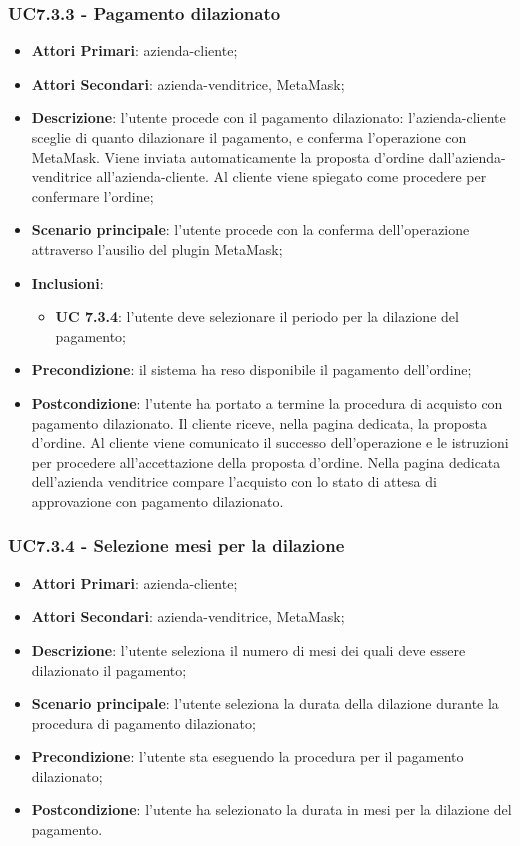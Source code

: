 \subsubsection{UC7.3.3 - Pagamento dilazionato}
\begin{itemize}
	\item \textbf{Attori Primari}: azienda-cliente;
	\item \textbf{Attori Secondari}: azienda-venditrice, MetaMask\glo;
	\item \textbf{Descrizione}: l'utente procede con il pagamento dilazionato: l'azienda-cliente sceglie di quanto dilazionare il pagamento, e conferma l'operazione con MetaMask\glo. Viene inviata automaticamente la proposta d'ordine dall'azienda-venditrice all'azienda-cliente. Al cliente viene spiegato come procedere per confermare l'ordine;
	\item \textbf{Scenario principale}: l'utente procede con la conferma dell'operazione attraverso l'ausilio del plugin MetaMask\glo;
	\item \textbf{Inclusioni}: 
	\begin{itemize}
		\item \textbf{UC 7.3.4}: l'utente deve selezionare il periodo per la dilazione del pagamento;
	\end{itemize}
	\item \textbf{Precondizione}: il sistema ha reso disponibile il pagamento dell'ordine;
	\item \textbf{Postcondizione}: l'utente ha portato a termine la procedura di acquisto con pagamento dilazionato. Il cliente riceve, nella pagina dedicata, la proposta d'ordine. Al cliente viene comunicato il successo dell'operazione e le istruzioni per procedere all'accettazione della proposta d'ordine. Nella pagina dedicata dell'azienda venditrice compare l'acquisto con lo stato di attesa di approvazione con pagamento dilazionato.
\end{itemize}
\subsubsection{UC7.3.4 - Selezione mesi per la dilazione}
\begin{itemize}
	\item \textbf{Attori Primari}: azienda-cliente;
	\item \textbf{Attori Secondari}: azienda-venditrice, MetaMask\glo;
	\item \textbf{Descrizione}: l'utente seleziona il numero di mesi dei quali deve essere dilazionato il pagamento;
	\item \textbf{Scenario principale}: l'utente seleziona la durata della dilazione durante la procedura di pagamento dilazionato\glo;
	\item \textbf{Precondizione}: l'utente sta eseguendo la procedura per il pagamento dilazionato;
	\item \textbf{Postcondizione}: l'utente ha selezionato la durata in mesi per la dilazione del pagamento.
\end{itemize}

